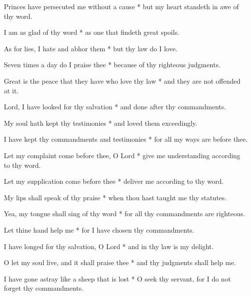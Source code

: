 Princes have persecuted me without a cause * but my heart standeth in awe of thy word.

I am as glad of thy word * as one that findeth great spoils.

As for lies, I hate and abhor them * but thy law do I love.

Seven times a day do I praise thee * because of thy righteous judgments.

Great is the peace that they have who love thy law * and they are not offended at it.

Lord, I have looked for thy salvation * and done after thy commandments.

My soul hath kept thy testimonies * and loved them exceedingly.

I have kept thy commandments and testimonies * for all my ways are before thee.

Let my complaint come before thee, O Lord * give me understanding according to thy word.

Let my supplication come before thee * deliver me according to thy word.

My lips shall speak of thy praise * when thou hast taught me thy statutes.

Yea, my tongue shall sing of thy word * for all thy commandments are righteous.

Let thine hand help me * for I have chosen thy commandments.

I have longed for thy salvation, O Lord * and in thy law is my delight.

O let my soul live, and it shall praise thee * and thy judgments shall help me.

I have gone astray like a sheep that is lost * O seek thy servant, for I do not forget thy commandments.